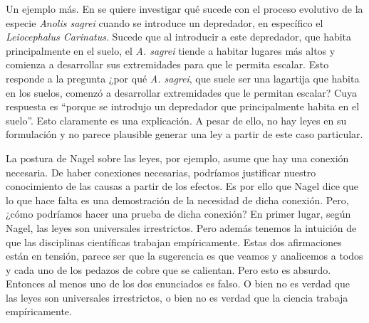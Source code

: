 Un ejemplo más. En \cite{Losos2004} se quiere investigar qué sucede con el proceso evolutivo de la especie \textit{Anolis sagrei}%
cuando se introduce un depredador, en específico el \textit{Leiocephalus Carinatus}.%
Sucede que al introducir a este depredador, que habita principalmente en el suelo, el \textit{A. sagrei} tiende a habitar lugares más altos y comienza a desarrollar sus extremidades para que%
le permita escalar. Esto responde a la pregunta ¿por qué \textit{A. sagrei}, que suele ser una lagartija que habita en los suelos, comenzó a desarrollar extremidades que le permitan escalar? Cuya respuesta es ``porque se introdujo un depredador que principalmente habita en el suelo''. Esto claramente es una explicación.%
A pesar de ello, no hay leyes en su formulación y no parece plausible generar una ley a partir de este caso particular.

La postura de Nagel sobre las leyes, por ejemplo, asume que hay una conexión necesaria. De haber conexiones necesarias, podríamos justificar nuestro conocimiento de las causas a partir de los efectos. Es por ello que Nagel dice que lo que hace falta es una demostración de la necesidad de dicha conexión. Pero, ¿cómo podríamos hacer una prueba de dicha conexión? En primer lugar, según Nagel, las leyes son universales irrestrictos. Pero además tenemos la intuición de que las disciplinas científicas trabajan empíricamente. Estas dos afirmaciones están en tensión, parece ser que la sugerencia es que veamos y analicemos a todos y cada uno de los pedazos de cobre que se calientan. Pero esto es absurdo. Entonces al menos uno de los dos enunciados es falso. O bien no es verdad que las leyes son universales irrestrictos, o bien no es verdad que la ciencia trabaja empíricamente.%

